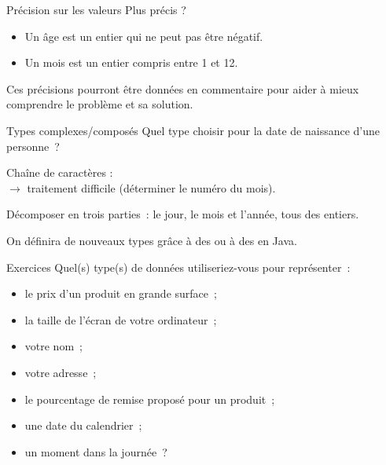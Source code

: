 \begin{hideedit}
\begin{frame}{Précision sur les valeurs}
  \pause
  Plus précis ?
  \begin{itemize}
    \item Un âge est un entier qui ne peut pas être négatif.
    \item Un mois est un entier compris entre 1 et 12.
  \end{itemize}

  Ces précisions pourront être données en commentaire
  pour aider à mieux comprendre le problème et sa solution.
\end{frame}

\begin{frame}{Types complexes/composés}
    Quel type choisir 
    pour la date de naissance d’une personne~?

    \pause
    Chaîne de caractères :  \\
    \pause \(\longrightarrow\) traitement difficile
    (déterminer le numéro du mois).

    \pause
    Décomposer en trois parties~: 
    le jour, le mois et l’année, tous des entiers.

    On définira de nouveaux types grâce à des  ou à des
     en Java.
\end{frame}

\begin{frame}{Exercices}
  Quel(s) type(s) de données utiliseriez-vous pour représenter~:
  \begin{itemize}
    \item le prix d’un produit en grande surface~;
    \item la taille de l’écran de votre ordinateur~;
    \item votre nom~;
    \item votre adresse~;
    \item le pourcentage de remise proposé pour un produit~;
    \item une date du calendrier~;
    \item un moment dans la journée~?
  \end{itemize}
\end{frame}


\end{hideedit}
